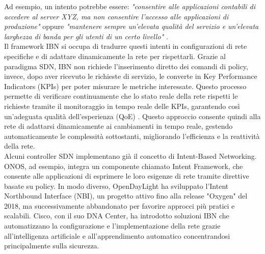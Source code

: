 Ad esempio, un intento potrebbe essere: \textit{"consentire alle applicazioni contabili di accedere al server XYZ, ma non consentire l’accesso alle applicazioni di produzione"} oppure
\textit{"mantenere sempre un'elevata qualità del servizio e un'elevata larghezza di banda per gli utenti di un certo livello"} \cite{esempint}.
\\Il framework IBN si occupa di tradurre questi intenti
in configurazioni di rete specifiche e di adattare dinamicamente la rete per rispettarli. %
Grazie al paradigma SDN, IBN non richiede l'inserimento diretto dei comandi di policy, invece, dopo aver ricevuto le richieste di servizio, le converte in Key Performance Indicators (KPIs) per poter misurare le metriche interessate.
Questo processo permette di verificare continuamente che lo stato reale della rete rispetti le richieste tramite il monitoraggio in tempo reale delle KPIs, garantendo così un'adeguata qualità dell'esperienza (QoE) \cite{qoe}.
Questo approccio consente quindi alla rete di adattarsi dinamicamente ai cambiamenti in tempo reale, gestendo automaticamente le complessità sottostanti, migliorando l'efficienza e la reattività della rete.
\\Alcuni controller SDN implementano già il concetto di Intent-Based Networking. 
\\ONOS, ad esempio, integra un componente chiamato Intent Framework, che consente alle applicazioni di esprimere le loro esigenze di rete tramite direttive basate su policy. 
In modo diverso, OpenDayLight ha sviluppato l'Intent Northbound Interface (NBI), un progetto attivo fino alla release "Oxygen" del 2018, ma successivamente abbandonato per favorire approcci più pratici e scalabili. 
Cisco, con il suo DNA Center, ha introdotto soluzioni IBN che automatizzano la configurazione e l'implementazione della rete grazie all'intelligenza artificiale e all'apprendimento automatico concentrandosi principalmente sulla sicurezza. 
